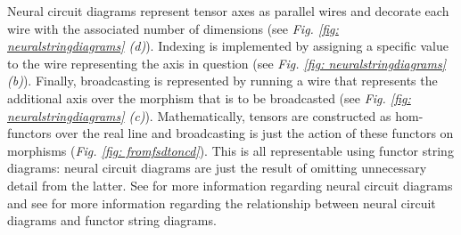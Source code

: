 \documentclass[11pt,a4paper,openright,twoside]{report}
\theoremstyle{plain}
\theoremstyle{definition}
\begin{document}
Neural circuit diagrams represent tensor axes as parallel wires and decorate each wire with the associated number of dimensions (see \textit{Fig. \ref{fig: neuralstringdiagrams} (d)}). Indexing is implemented by assigning a specific value to the wire representing the axis in question (see \textit{Fig. \ref{fig: neuralstringdiagrams} (b)}). Finally, broadcasting is represented by running a wire that represents the additional axis over the morphism that is to be broadcasted (see \textit{Fig. \ref{fig: neuralstringdiagrams} (c)}). Mathematically, tensors are constructed as hom-functors over the real line and broadcasting is just the action of these functors on morphisms (\textit{Fig. \ref{fig: fromfsdtoncd}}). This is all representable using functor string diagrams: neural circuit diagrams are just the result of omitting unnecessary detail from the latter. See \cite{abbott2024neural} for more information regarding neural circuit diagrams and see \cite{abbott2023robust} for more information regarding the relationship between neural circuit diagrams and functor string diagrams.
\end{document}
